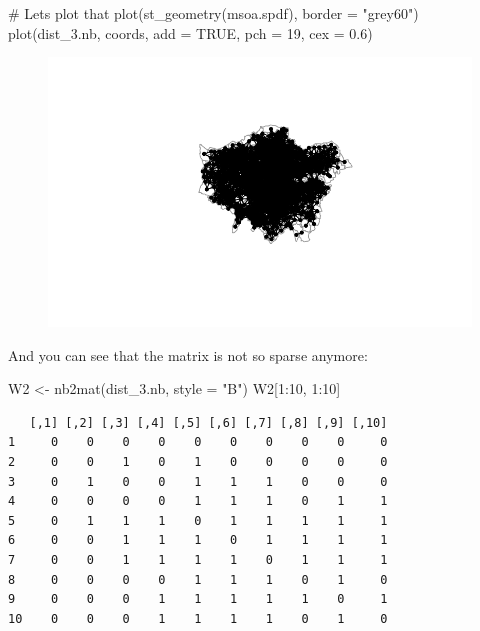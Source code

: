 \documentclass[
  letterpaper,
  DIV=11,
  numbers=noendperiod]{scrreprt}
\newenvironment{Shaded}{\begin{snugshade}}{\end{snugshade}}
\newcommand{\AttributeTok}[1]{\textcolor[rgb]{0.40,0.45,0.13}{#1}}
\newcommand{\CommentTok}[1]{\textcolor[rgb]{0.37,0.37,0.37}{#1}}
\newcommand{\ConstantTok}[1]{\textcolor[rgb]{0.56,0.35,0.01}{#1}}
\newcommand{\DecValTok}[1]{\textcolor[rgb]{0.68,0.00,0.00}{#1}}
\newcommand{\FloatTok}[1]{\textcolor[rgb]{0.68,0.00,0.00}{#1}}
\newcommand{\FunctionTok}[1]{\textcolor[rgb]{0.28,0.35,0.67}{#1}}
\newcommand{\NormalTok}[1]{\textcolor[rgb]{0.00,0.23,0.31}{#1}}
\newcommand{\OtherTok}[1]{\textcolor[rgb]{0.00,0.23,0.31}{#1}}
\newcommand{\SpecialCharTok}[1]{\textcolor[rgb]{0.37,0.37,0.37}{#1}}
\newcommand{\StringTok}[1]{\textcolor[rgb]{0.13,0.47,0.30}{#1}}
\begin{document}
\begin{Shaded}
\begin{Highlighting}[]
\CommentTok{\# Lets plot that}
\FunctionTok{plot}\NormalTok{(}\FunctionTok{st\_geometry}\NormalTok{(msoa.spdf), }\AttributeTok{border =} \StringTok{"grey60"}\NormalTok{)}
\FunctionTok{plot}\NormalTok{(dist\_3.nb, coords, }
     \AttributeTok{add =} \ConstantTok{TRUE}\NormalTok{, }\AttributeTok{pch =} \DecValTok{19}\NormalTok{, }\AttributeTok{cex =} \FloatTok{0.6}\NormalTok{)}
\end{Highlighting}
\end{Shaded}

\begin{figure}[H]

{\centering \includegraphics{03_weights_files/figure-pdf/unnamed-chunk-7-1.pdf}

}

\end{figure}

And you can see that the matrix is not so sparse anymore:

\begin{Shaded}
\begin{Highlighting}[]
\NormalTok{W2 }\OtherTok{\textless{}{-}} \FunctionTok{nb2mat}\NormalTok{(dist\_3.nb, }\AttributeTok{style =} \StringTok{"B"}\NormalTok{)}
\NormalTok{W2[}\DecValTok{1}\SpecialCharTok{:}\DecValTok{10}\NormalTok{, }\DecValTok{1}\SpecialCharTok{:}\DecValTok{10}\NormalTok{]}
\end{Highlighting}
\end{Shaded}

\begin{verbatim}
   [,1] [,2] [,3] [,4] [,5] [,6] [,7] [,8] [,9] [,10]
1     0    0    0    0    0    0    0    0    0     0
2     0    0    1    0    1    0    0    0    0     0
3     0    1    0    0    1    1    1    0    0     0
4     0    0    0    0    1    1    1    0    1     1
5     0    1    1    1    0    1    1    1    1     1
6     0    0    1    1    1    0    1    1    1     1
7     0    0    1    1    1    1    0    1    1     1
8     0    0    0    0    1    1    1    0    1     0
9     0    0    0    1    1    1    1    1    0     1
10    0    0    0    1    1    1    1    0    1     0
\end{verbatim}
\end{document}
